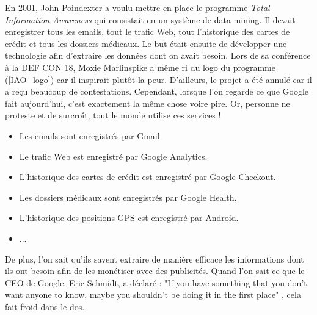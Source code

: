 En 2001, John Poindexter a voulu mettre en place le programme \textit{Total Information Awareness} qui consistait en un système de data mining. Il devait enregistrer tous les emails, tout le trafic Web, tout l'historique des cartes de crédit et tous les dossiers médicaux. Le but était ensuite de développer une technologie afin d'extraire les données dont on avait besoin. Lors de sa conférence à la DEF CON 18, Moxie Marlinspike a même ri du logo du programme (\autoref{IAO_logo}) car il inspirait plutôt la peur. D'ailleurs, le projet a été annulé car il a reçu beaucoup de contestations. Cependant, lorsque l'on regarde ce que Google fait aujourd'hui, c'est exactement la même chose voire pire. Or, personne ne proteste et de surcroît, tout le monde utilise ces services !
\begin{itemize}
  \item Les emails sont enregistrés par Gmail.
  \item Le trafic Web est enregistré par Google Analytics.
  \item L'historique des cartes de crédit est enregistré par Google Checkout.
  \item Les dossiers médicaux sont enregistrés par Google Health.
  \item L'historique des positions GPS est enregistré par Android.
  \item ...
\end{itemize}
De plus, l'on sait qu'ils savent extraire de manière efficace les informations dont ils ont besoin afin de les monétiser avec des publicités. Quand l'on sait ce que le CEO de Google, Eric Schmidt, a déclaré : "If you have something that you don't want anyone to know, maybe you shouldn't be doing it in the first place" \cite{privacy_eric_schmidt}, cela fait froid dans le dos.

